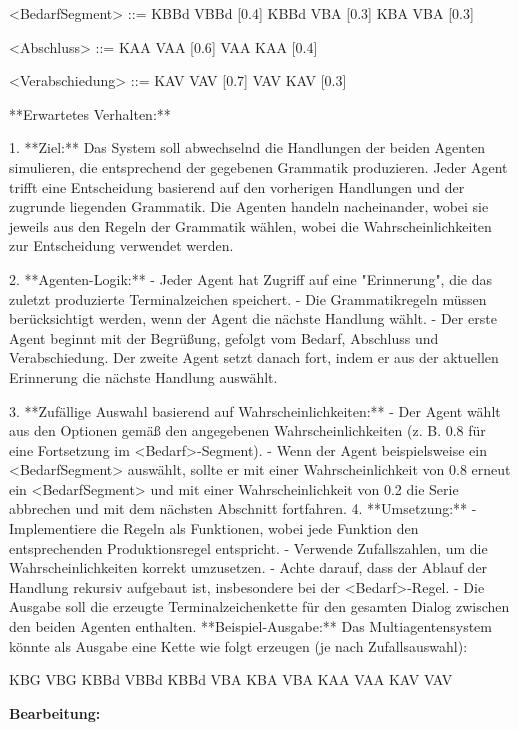 \documentclass[
]{article}
\begin{document}
\textless BedarfSegment\textgreater{} ::= KBBd VBBd {[}0.4{]} \textbar{}
KBBd VBA {[}0.3{]} \textbar{} KBA VBA {[}0.3{]}

\textless Abschluss\textgreater{} ::= KAA VAA {[}0.6{]} \textbar{} VAA
KAA {[}0.4{]}

\textless Verabschiedung\textgreater{} ::= KAV VAV {[}0.7{]} \textbar{}
VAV KAV {[}0.3{]}

**Erwartetes Verhalten:**

1. **Ziel:** Das System soll abwechselnd die Handlungen der beiden
Agenten simulieren, die entsprechend der gegebenen Grammatik
produzieren. Jeder Agent trifft eine Entscheidung basierend auf den
vorherigen Handlungen und der zugrunde liegenden Grammatik. Die Agenten
handeln nacheinander, wobei sie jeweils aus den Regeln der Grammatik
wählen, wobei die Wahrscheinlichkeiten zur Entscheidung verwendet
werden.

2. **Agenten-Logik:** - Jeder Agent hat Zugriff auf eine "Erinnerung",
die das zuletzt produzierte Terminalzeichen speichert. - Die
Grammatikregeln müssen berücksichtigt werden, wenn der Agent die nächste
Handlung wählt. - Der erste Agent beginnt mit der Begrüßung, gefolgt vom
Bedarf, Abschluss und Verabschiedung. Der zweite Agent setzt danach
fort, indem er aus der aktuellen Erinnerung die nächste Handlung
auswählt.

3. **Zufällige Auswahl basierend auf Wahrscheinlichkeiten:** - Der Agent
wählt aus den Optionen gemäß den angegebenen Wahrscheinlichkeiten (z. B.
0.8 für eine Fortsetzung im \textless Bedarf\textgreater-Segment). -
Wenn der Agent beispielsweise ein \textless BedarfSegment\textgreater{}
auswählt, sollte er mit einer Wahrscheinlichkeit von 0.8 erneut ein
\textless BedarfSegment\textgreater{} und mit einer Wahrscheinlichkeit
von 0.2 die Serie abbrechen und mit dem nächsten Abschnitt fortfahren.
4. **Umsetzung:** - Implementiere die Regeln als Funktionen, wobei jede
Funktion den entsprechenden Produktionsregel entspricht. - Verwende
Zufallszahlen, um die Wahrscheinlichkeiten korrekt umzusetzen. - Achte
darauf, dass der Ablauf der Handlung rekursiv aufgebaut ist,
insbesondere bei der \textless Bedarf\textgreater-Regel. - Die Ausgabe
soll die erzeugte Terminalzeichenkette für den gesamten Dialog zwischen
den beiden Agenten enthalten. **Beispiel-Ausgabe:** Das
Multiagentensystem könnte als Ausgabe eine Kette wie folgt erzeugen (je
nach Zufallsauswahl):

KBG VBG KBBd VBBd KBBd VBA KBA VBA KAA VAA KAV VAV

\textbf{Bearbeitung:}
\end{document}

